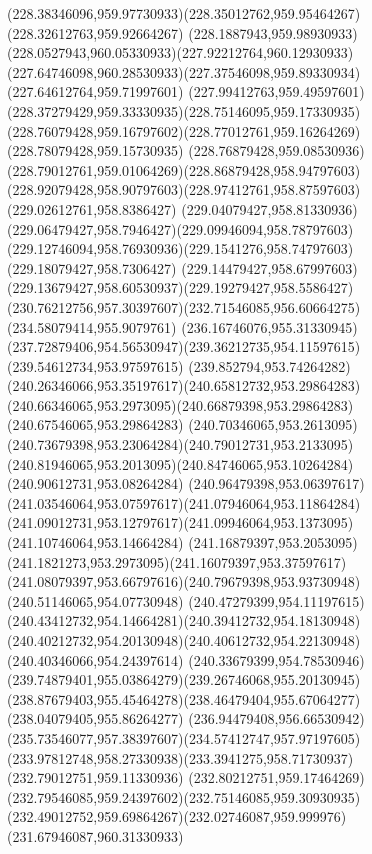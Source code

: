{    \curveto(228.38346096,959.97730933)(228.35012762,959.95464267)(228.32612763,959.92664267)
    \curveto(228.1887943,959.98930933)(228.0527943,960.05330933)(227.92212764,960.12930933)
    \curveto(227.64746098,960.28530933)(227.37546098,959.89330934)(227.64612764,959.71997601)
    \curveto(227.99412763,959.49597601)(228.37279429,959.33330935)(228.75146095,959.17330935)
    \curveto(228.76079428,959.16797602)(228.77012761,959.16264269)(228.78079428,959.15730935)
    \curveto(228.76879428,959.08530936)(228.79012761,959.01064269)(228.86879428,958.94797603)
    \curveto(228.92079428,958.90797603)(228.97412761,958.87597603)(229.02612761,958.8386427)
    \curveto(229.04079427,958.81330936)(229.06479427,958.7946427)(229.09946094,958.78797603)
    \curveto(229.12746094,958.76930936)(229.1541276,958.74797603)(229.18079427,958.7306427)
    \curveto(229.14479427,958.67997603)(229.13679427,958.60530937)(229.19279427,958.5586427)
    \curveto(230.76212756,957.30397607)(232.71546085,956.60664275)(234.58079414,955.9079761)
    \curveto(236.16746076,955.31330945)(237.72879406,954.56530947)(239.36212735,954.11597615)
    \lineto(239.54612734,953.97597615)
    \curveto(239.852794,953.74264282)(240.26346066,953.35197617)(240.65812732,953.29864283)
    \curveto(240.66346065,953.2973095)(240.66879398,953.29864283)(240.67546065,953.29864283)
    \curveto(240.70346065,953.2613095)(240.73679398,953.23064284)(240.79012731,953.2133095)
    \curveto(240.81946065,953.2013095)(240.84746065,953.10264284)(240.90612731,953.08264284)
    \curveto(240.96479398,953.06397617)(241.03546064,953.07597617)(241.07946064,953.11864284)
    \curveto(241.09012731,953.12797617)(241.09946064,953.1373095)(241.10746064,953.14664284)
    \curveto(241.16879397,953.2053095)(241.1821273,953.2973095)(241.16079397,953.37597617)
    \curveto(241.08079397,953.66797616)(240.79679398,953.93730948)(240.51146065,954.07730948)
    \curveto(240.47279399,954.11197615)(240.43412732,954.14664281)(240.39412732,954.18130948)
    \curveto(240.40212732,954.20130948)(240.40612732,954.22130948)(240.40346066,954.24397614)
    \curveto(240.33679399,954.78530946)(239.74879401,955.03864279)(239.26746068,955.20130945)
    \curveto(238.87679403,955.45464278)(238.46479404,955.67064277)(238.04079405,955.86264277)
    \curveto(236.94479408,956.66530942)(235.73546077,957.38397607)(234.57412747,957.97197605)
    \curveto(233.97812748,958.27330938)(233.3941275,958.71730937)(232.79012751,959.11330936)
    \curveto(232.80212751,959.17464269)(232.79546085,959.24397602)(232.75146085,959.30930935)
    \curveto(232.49012752,959.69864267)(232.02746087,959.999976)(231.67946087,960.31330933)
}
